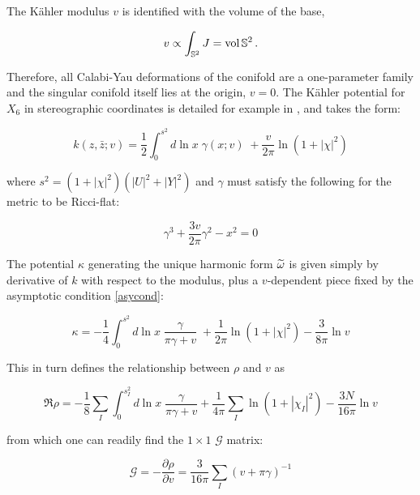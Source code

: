 The K\"ahler modulus $v$ is identified with the volume of the base,

\begin{equation}
	v \propto \int_{\mathbb{S}^2} J = \operatorname{vol} \mathbb{S}^2\,.
	\label{}
\end{equation}

Therefore, all Calabi-Yau deformations of the conifold are a one-parameter family and the singular conifold itself lies at the origin, $v=0$. The K\"ahler potential for $X_6$ in stereographic coordinates is detailed for example in \cite{PandoZayas}, and takes the form:

\begin{equation}
	k(z,\bar z; v) = \frac{1}{2} \int_0^{s^2} d\ln x \; \gamma(x;v) \; + \frac{v}{2\pi} \ln(1+|\chi|^2)
	\label{}
\end{equation}

where $s^2 = (1+|\chi|^2)(|U|^2 + |Y|^2)$ and $\gamma$ must satisfy the following for the metric to be Ricci-flat:

\begin{equation}
	\gamma^3 + \frac{3v}{2\pi} \gamma^2 - x^2 = 0
	\label{}
\end{equation}

The potential $\kappa$ generating the unique harmonic form $\widetilde{\omega}$ is given simply by derivative of $k$ with respect to the modulus, plus a $v$-dependent piece fixed by the asymptotic condition \eqref{asycond}:

\begin{equation}
	\kappa = -\frac{1}{4} \int_0^{s^2} d\ln x \; \frac{\gamma}{\pi\gamma+v} \; + \frac{1}{2\pi} \ln(1+ |\chi|^2) - \frac{3}{8\pi}\ln v
	\label{}
\end{equation}

This in turn defines the relationship between $\rho$ and $v$ as

\begin{equation}
	\Re \rho = - \frac{1}{8} \sum_I \int_0^{s_I^2} d\ln x \; \frac{\gamma}{\pi\gamma + v} + \frac{1}{4\pi}\sum_I \ln(1+|\chi_I|^2) - \frac{3N}{16\pi} \ln v
\end{equation}

from which one can readily find the $1\times1$ $\mathcal{G}$ matrix:

\begin{equation}
	\mathcal{G} = - \frac{\partial \rho}{\partial v} = \frac{3}{16\pi}\sum_I (v+\pi\gamma)^{-1}
	\label{}
\end{equation}


